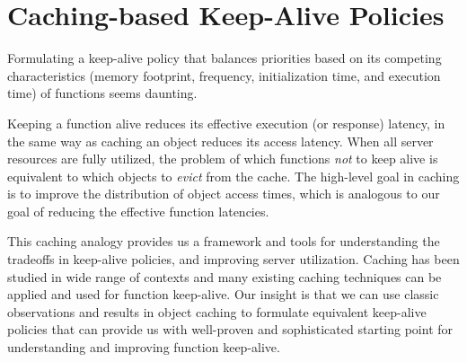 
\section{Caching-based Keep-Alive Policies}
\label{sec:cache-keep-alive}



Formulating a keep-alive policy that balances priorities based on its competing characteristics (memory footprint, frequency, initialization time, and execution time) of functions seems daunting. 

\begin{comment}
\begin{framed}
  \vspace*{-6pt}
  \noindent \emph{The central insight of this paper is that keeping functions alive is equivalent to keeping objects in a cache.}
  \vspace*{-6pt}
\end{framed}
\vspace*{-2pt}
\end{comment}

\noindent Keeping a function alive reduces its effective execution (or response) latency, in the same way as caching an object reduces its access latency. 
When all server resources are fully utilized, the problem of which functions \emph{not} to keep alive is equivalent to which objects to \emph{evict} from the cache. 
The high-level goal in caching is to improve the distribution of object access times, which is analogous to our goal of reducing the effective function latencies. 


This caching analogy provides us a framework and tools for understanding the tradeoffs in keep-alive policies, and improving server utilization. 
Caching has been studied in wide range of contexts and many existing caching techniques can be applied and used for function keep-alive. 
Our insight is that we can use classic observations and results in object caching to formulate equivalent keep-alive policies that can provide us with well-proven and sophisticated starting point for understanding and improving function keep-alive.  



